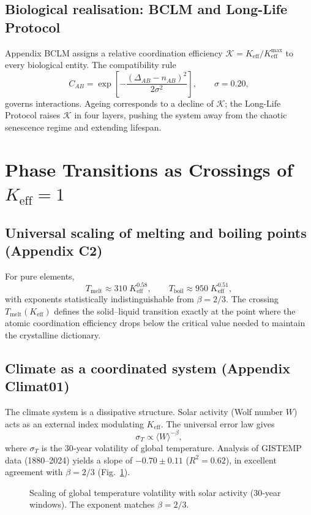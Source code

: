 \documentclass[12pt,a4paper]{article}
\newcommand{\Keff}{K_{\mathrm{eff}}}
\newcommand{\REL}{\mathcal{K}}
\begin{document}
	\subsection{Biological realisation: BCLM and Long-Life Protocol}
	
	Appendix BCLM assigns a relative coordination efficiency $\REL = \Keff/\Keff^{\max}$
	to every biological entity. The compatibility rule
	\[
	C_{AB} = \exp\!\left[-\frac{(\Delta_{AB} - n_{AB})^2}{2\sigma^2}\right],\qquad \sigma = 0.20,
	\]
	governs interactions. Ageing corresponds to a decline of $\REL$; the Long-Life
	Protocol raises $\REL$ in four layers, pushing the system away from the chaotic
	senescence regime and extending lifespan.
	
	\section{Phase Transitions as Crossings of $\Keff = 1$}
	
	\subsection{Universal scaling of melting and boiling points (Appendix C2)}
	
	For pure elements,
	\[
	T_{\text{melt}} \approx 310\;\Keff^{0.58}, \qquad
	T_{\text{boil}} \approx 950\;\Keff^{0.51},
	\]
	with exponents statistically indistinguishable from $\beta = 2/3$. The crossing
	$T_{\text{melt}}(\Keff)$ defines the solid–liquid transition exactly at the point
	where the atomic coordination efficiency drops below the critical value needed to
	maintain the crystalline dictionary.
	
	\subsection{Climate as a coordinated system (Appendix Climat01)}
	
	The climate system is a dissipative structure. Solar activity (Wolf number $W$)
	acts as an external index modulating $\Keff$. The universal error law gives
	\[
	\sigma_T \propto \langle W \rangle^{-\beta},
	\]
	where $\sigma_T$ is the 30‑year volatility of global temperature. Analysis of
	GISTEMP data (1880–2024) yields a slope of $-0.70\pm0.11$ ($R^2=0.62$), in excellent
	agreement with $\beta = 2/3$ (Fig.~\ref{fig:climate_scaling}).
	
	\begin{figure}[H]
		\centering
		\caption{Scaling of global temperature volatility with solar activity (30‑year windows).
			The exponent matches $\beta = 2/3$.}
		\label{fig:climate_scaling}
	\end{figure}
	
\end{document}
